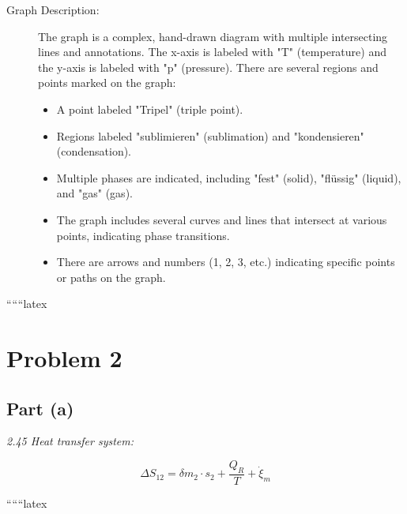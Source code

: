 \begin{description}
    \item[Graph Description:] The graph is a complex, hand-drawn diagram with multiple intersecting lines and annotations. The x-axis is labeled with "T" (temperature) and the y-axis is labeled with "p" (pressure). There are several regions and points marked on the graph:
    \begin{itemize}
        \item A point labeled "Tripel" (triple point).
        \item Regions labeled "sublimieren" (sublimation) and "kondensieren" (condensation).
        \item Multiple phases are indicated, including "fest" (solid), "flüssig" (liquid), and "gas" (gas).
        \item The graph includes several curves and lines that intersect at various points, indicating phase transitions.
        \item There are arrows and numbers (1, 2, 3, etc.) indicating specific points or paths on the graph.
    \end{itemize}
\end{description}

``````latex


\section*{Problem 2}

\subsection*{Part (a)}

\textit{2.45 Heat transfer system:}

\[
\Delta S_{12} = \delta m_2 \cdot s_2 + \frac{Q_R}{T} + \dot{\xi}_m
\]

``````latex
